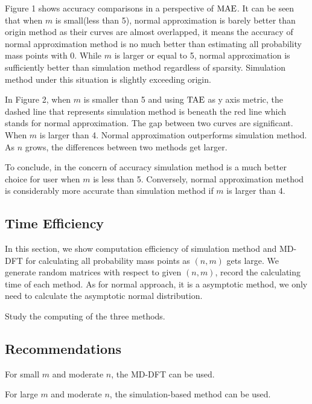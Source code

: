 \documentclass[12pt]{article}
\newcommand{\TAE}{{\rm TAE}}
\newcommand{\MAE}{{\rm MAE}}
\begin{document}
Figure 1 shows accuracy comparisons in a perspective of $\MAE$. It can be seen that when $m$ is small(less than 5), normal approximation is barely better than origin method as their curves are almost overlapped, it means the accuracy of normal approximation method is no much better than estimating all probability mass points with 0. While $m$ is larger or equal to 5, normal approximation is sufficiently better than simulation method regardless of sparsity. Simulation method under this situation is slightly exceeding origin.

In Figure 2, when $m$ is smaller than 5 and using $\TAE$ as y axis metric, the dashed line that represents simulation method is beneath the red line which stands for normal approximation. The gap between two curves are significant. When $m$ is larger than 4. Normal approximation outperforms simulation method. As $n$ grows, the differences between two methods get larger.

To conclude, in the concern of accuracy simulation method is a much better choice for user when $m$ is less than 5. Conversely, normal approximation method is considerably more accurate than simulation method if $m$ is larger than 4.


\subsection{Time Efficiency}
In this section, we show computation efficiency of simulation method and MD-DFT for calculating all probability mass points as $(n,m)$ gets large. We generate random matrices with respect to given $(n, m)$, record the calculating time of each method. As for normal approach, it is a asymptotic method, we only need to calculate the asymptotic normal distribution.

Study the computing of the three methods.


\subsection{Recommendations}

For small $m$ and moderate $n$, the MD-DFT can be used.

For large $m$ and moderate $n$, the simulation-based method can be used.
\end{document}
